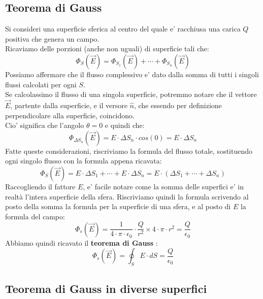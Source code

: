 \documentclass[a4paper, 10pt]{article}
\begin{document}
		\subsection{Teorema di Gauss}
			Si consideri una superficie sferica al centro del quale e' racchiusa una carica $Q$ positiva che genera un campo. \\
			Ricaviamo delle porzioni (anche non uguali) di superficie tali che:
			\[ \Phi_S(\overrightarrow{E}) =  \Phi_{S_1}(\overrightarrow{E}) + \cdots +  \Phi_{S_n}(\overrightarrow{E}) \]
			Possiamo affermare che il flusso complessivo e' dato dalla somma di tutti i singoli flussi calcolati per ogni $S$.\\
			Se calcolassimo il flusso di una singola superficie, potremmo notare che il vettore $\overrightarrow{E}$, 
			partente dalla superficie, e il versore $\widehat{n}$, che essendo per definizione perpendicolare alla superficie,
			coincidono. \\ Cio' significa che l'angolo $\theta = 0$ e quindi che:
			\[ \Phi_{\Delta S_n}(\overrightarrow{E}) = E \cdot \Delta S_n \cdot cos(0) = E \cdot \Delta S_n \] 
			Fatte queste considerazioni, riscriviamo la formula del flusso totale, sostituendo ogni singolo flusso con la formula
			 appena ricavata:
			\[ \Phi_S(\overrightarrow{E}) = E \cdot \Delta S_1 + \cdots + E \cdot \Delta S_n =
			E \cdot (\Delta S_1 + \cdots + \Delta S_n) \]
			Raccogliendo il fattore $E$, e' facile notare come la somma delle superfici e' in realtà l'intera superficie della
			sfera. Riscriviamo quindi la formula scrivendo al posto della somma la formula per la superficie di una sfera, e al
			posto di $E$ la formula del campo:
			\[ \Phi_s(\overrightarrow{E}) = \frac{1}{4 \cdot \pi \cdot \epsilon_0} \cdot \frac{Q}{r^2} \times 
			4 \cdot \pi \cdot r^2 = \frac{Q}{\epsilon_0} \]
			Abbiamo quindi ricavato il \textbf{teorema di Gauss} :
			\[ \Phi_s(\overrightarrow{E}) = \oint_{S} E \cdot dS = \frac{Q}{\epsilon_0} \]
		\subsection{Teorema di Gauss in diverse superfici}
\end{document}

